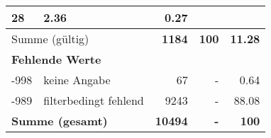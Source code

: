 \begin{longtable}{lXrrr}
       \num{28} &
       \num[round-mode=places,round-precision=2]{2.36} &
         \num[round-mode=places,round-precision=2]{0.27} \\
     \midrule
     \multicolumn{2}{l}{Summe (gültig)} &
       \textbf{\num{1184}} &
     \textbf{\num{100}} &
       \textbf{\num[round-mode=places,round-precision=2]{11.28}} \\
     \multicolumn{5}{l}{\textbf{Fehlende Werte}}\\
       -998 &
       keine Angabe &
         \num{67} &
        - &
         \num[round-mode=places,round-precision=2]{0.64} \\
       -989 &
       filterbedingt fehlend &
         \num{9243} &
        - &
         \num[round-mode=places,round-precision=2]{88.08} \\
     \midrule
     \multicolumn{2}{l}{\textbf{Summe (gesamt)}} &
          \textbf{\num{10494}} &
        \textbf{-} &
        \textbf{\num{100}} \\
     \bottomrule
     \end{longtable}
     
